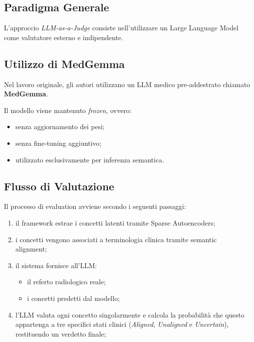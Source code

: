 \subsection{Paradigma Generale}

L'approccio \textit{LLM-as-a-Judge} consiste nell'utilizzare un Large Language Model come valutatore esterno e indipendente.

\subsection{Utilizzo di MedGemma}

Nel lavoro originale, gli autori utilizzano un LLM medico pre-addestrato chiamato \textbf{MedGemma}.

Il modello viene mantenuto \textit{frozen}, ovvero:

\begin{itemize}
    \item senza aggiornamento dei pesi;
    \item senza fine-tuning aggiuntivo;
    \item utilizzato esclusivamente per inferenza semantica.
\end{itemize}

\subsection{Flusso di Valutazione}

Il processo di evaluation avviene secondo i seguenti passaggi:

\begin{enumerate}
    \item il framework estrae i concetti latenti tramite Sparse Autoencoders;
    
    \item i concetti vengono associati a terminologia clinica tramite semantic alignment;
    
    \item il sistema fornisce all'LLM:
    \begin{itemize}
        \item il referto radiologico reale;
        \item i concetti predetti dal modello;
    \end{itemize}
    
    \item l'LLM valuta ogni concetto singolarmente e calcola la probabilità che questo appartenga a tre specifici stati clinici (\textit{Aligned}, \textit{Unaligned} e \textit{Uncertain}), restituendo un verdetto finale;
\end{enumerate}

